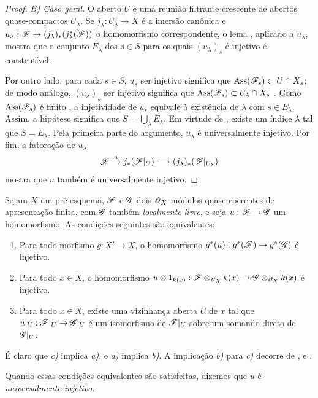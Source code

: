 \begin{proof}
\medskip
\emph{B) Caso geral.}
O aberto $U$ é
uma reunião filtrante
crescente de abertos
quase-compactos
$U_\lambda$. Se
$j_\lambda:
U_\lambda\to X$
é a imersão canônica
e
$u_\lambda:
\sh{F}\to
(j_\lambda)_*
(j_\lambda^*(\sh{F}))$
o homomorfismo
correspondente,
o lema
,
aplicado a
$u_\lambda$, mostra
que o conjunto
$E_\lambda$ dos
$s\in S$ para os quais
$(u_\lambda)_s$ é
injetivo é
construtível.

Por outro lado,
para cada $s\in S$,
$u_s$ ser injetivo
significa que
$\operatorname{Ass}
(\mathscr{F}_s)
\subset U\cap X_s$;
de modo análogo,
$(u_\lambda)_s$
ser injetivo
significa que
$\operatorname{Ass}
(\mathscr{F}_s)
\subset U_\lambda
\cap X_s$
.
Como
$\operatorname{Ass}
(\mathscr{F}_s)$ é
finito
,
a injetividade de
$u_s$ equivale à
existência de
$\lambda$ com
$s\in E_\lambda$.
Assim, a hipótese
significa que
$S=\bigcup_\lambda
E_\lambda$. Em
virtude de
,
existe um índice
$\lambda$ tal que
$S=E_\lambda$.
Pela primeira parte
do argumento,
$u_\lambda$ é
universalmente
injetivo. Por fim,
a fatoração de
$u_\lambda$
\[
\mathscr{F}
\xrightarrow{u}
j_*(\mathscr{F}|_U)
\longrightarrow
(j_\lambda)_*
(\mathscr{F}|_{U_\lambda})
\]
mostra que $u$
também é
universalmente
injetivo.
\end{proof}

\begin{remark}[11.9.18]
\label{IV.11.9.18}
Sejam $X$ um
pré-esquema,
$\mathscr{F}$ e
$\mathscr{G}$ dois
$\mathscr{O}_X$-módulos
quase-coerentes de
apresentação finita,
com $\mathscr{G}$ também
\emph{localmente
livre}, e seja
$u:\sh{F}\to\sh{G}$
um homomorfismo.
As condições seguintes
são equivalentes:
\begin{enumerate}[label=\emph{\alph*)}]
\item Para todo morfismo
$g:X'\to X$, o
homomorfismo
$g^*(u):
g^*(\sh{F})\to
g^*(\sh{G})$
é injetivo.
\item Para todo
$x\in X$, o
homomorfismo
$u\otimes1_{k(x)}:
\sh{F}\otimes_{\sh{O}_X}
k(x)\to
\sh{G}\otimes_{\sh{O}_X}
k(x)$
é injetivo.
\item Para todo
$x\in X$, existe
uma vizinhança aberta
$U$ de $x$ tal que
$u|_U:
\sh{F}|_U\to
\sh{G}|_U$
é um isomorfismo
de $\mathscr{F}|_U$
sobre um somando
direto de
$\mathscr{G}|_U$.
\end{enumerate}

É claro que
\emph{c)} implica
\emph{a)}, e
\emph{a)} implica
\emph{b)}. A
implicação
\emph{b)} para
\emph{c)} decorre
de ,
e .

Quando essas
condições equivalentes
são satisfeitas,
dizemos que $u$
é \emph{universalmente
injetivo}.
\end{remark}

